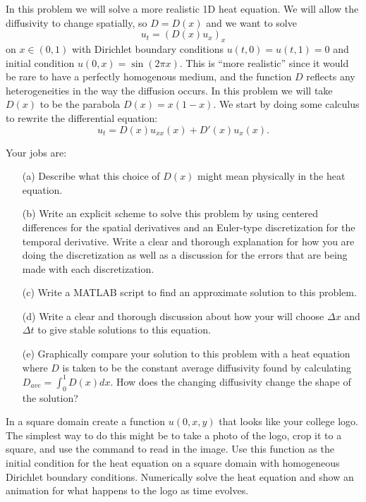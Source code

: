 \begin{problem}
    In this problem we will solve a more realistic 1D heat equation.  We will allow the
    diffusivity to change spatially, so $D = D(x)$ and we want to solve
    \[ u_t = \left( D(x) u_x \right)_x \]
    on $x \in (0,1)$ with Dirichlet boundary conditions $u(t,0) = u(t,1) = 0$ and initial
    condition $u(0,x) = \sin(2 \pi x)$.  This is ``more realistic'' since it would be rare
    to have a perfectly homogenous medium, and the function $D$ reflects any
    heterogeneities in the way the diffusion occurs.  In this problem we will take $D(x)$
    to be the parabola $D(x)= x(1-x)$. We start by doing some calculus to rewrite the
    differential equation:
    \[ u_t = D(x) u_{xx}(x) + D'(x) u_x(x). \]

    Your jobs are:
    \begin{enumerate}
        \item[(a)] Describe what this choice of $D(x)$ might mean physically in the heat
            equation.
        \item[(b)] Write an explicit scheme to solve this problem by using centered differences
            for the spatial derivatives and an Euler-type discretization for the temporal
            derivative.  Write a clear and thorough explanation for how you are doing the
            discretization as well as a discussion for the errors that are being made with
            each discretization.
        \item[(c)] Write a MATLAB script to find an approximate solution to this problem.
        \item[(d)] Write a clear and thorough discussion about how your will choose $\Delta x$
            and $\Delta t$ to give stable solutions to this equation.
        \item[(e)] Graphically compare your solution to this problem with a heat equation
            where $D$ is taken to be the constant average diffusivity found by calculating
            $D_{ave} = \int_0^1 D(x) dx.$  How does the changing diffusivity change the
            shape of the solution?
    \end{enumerate}

\end{problem}

\begin{problem}
    In a square domain create a function $u(0,x,y)$ that looks like your college logo.
    The simplest way to do this might be to take a photo of the logo, crop it to a square,
    and use the  command to read in the image.  Use this function as the
    initial condition for the heat equation on a square domain with homogeneous Dirichlet
    boundary conditions.  Numerically solve the heat equation and show an animation for
    what happens to the logo as time evolves.
\end{problem}

